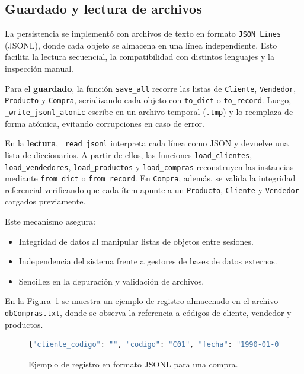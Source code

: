 \documentclass[11pt]{article}
\begin{document}
\subsection{Guardado y lectura de archivos}

La persistencia se implementó con archivos de texto en formato \texttt{JSON Lines} (JSONL), donde cada objeto se almacena en una línea independiente. Esto facilita la lectura secuencial, la compatibilidad con distintos lenguajes y la inspección manual.  

Para el \textbf{guardado}, la función \texttt{save\_all} recorre las listas de \texttt{Cliente}, \texttt{Vendedor}, \texttt{Producto} y \texttt{Compra}, serializando cada objeto con \texttt{to\_dict} o \texttt{to\_record}. Luego, \texttt{\_write\_jsonl\_atomic} escribe en un archivo temporal (\texttt{.tmp}) y lo reemplaza de forma atómica, evitando corrupciones en caso de error.  

En la \textbf{lectura}, \texttt{\_read\_jsonl} interpreta cada línea como JSON y devuelve una lista de diccionarios. A partir de ellos, las funciones \texttt{load\_clientes}, \texttt{load\_vendedores}, \texttt{load\_productos} y \texttt{load\_compras} reconstruyen las instancias mediante \texttt{from\_dict} o \texttt{from\_record}. En \texttt{Compra}, además, se valida la integridad referencial verificando que cada ítem apunte a un \texttt{Producto}, \texttt{Cliente} y \texttt{Vendedor} cargados previamente.


Este mecanismo asegura:
\begin{itemize}
    \item Integridad de datos al manipular listas de objetos entre sesiones.
    \item Independencia del sistema frente a gestores de bases de datos externos.
    \item Sencillez en la depuración y validación de archivos.
\end{itemize}

En la Figura~\ref{fig:jsonl} se muestra un ejemplo de registro almacenado en el archivo \texttt{dbCompras.txt}, donde se observa la referencia a códigos de cliente, vendedor y productos.

\begin{figure}[H]
    \centering
    \begin{lstlisting}[language=Python]
        {"cliente_codigo": "", "codigo": "C01", "fecha": "1990-01-01", "fechaVencFactura": "2024-04-20", "items": [{"cantidad": 2, "producto_codigo": ""}, {"cantidad": 10, "producto_codigo": "P01"}, {"cantidad": 20, "producto_codigo": "P02"}], "listado": ["", "P01", "P02"], "modoPago": "Tarjeta", "nFactura": "F001", "total": 11009.2, "valido": true, "vendedor_codigo": ""}
    \end{lstlisting}
    \caption{Ejemplo de registro en formato JSONL para una compra.}
    \label{fig:jsonl}
\end{figure}
\end{document}
